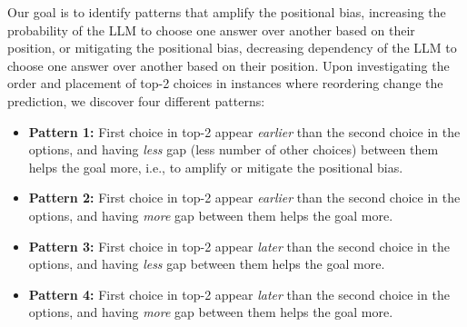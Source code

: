 \documentclass[11pt]{article}
\newcommand{\estevamc}[1]{\textcolor{purple}{Estevam: #1}}
\begin{document}
Our goal is to identify patterns that amplify the positional bias, increasing the probability of the LLM to choose one answer over another based on their position, or mitigating the positional bias, decreasing dependency of the LLM to choose one answer over another based on their position.  
Upon investigating the order and placement of top-2 choices in instances where reordering change the prediction, we discover four different patterns: %


\begin{itemize}
    \item \textbf{Pattern 1:} First choice in top-2 appear \textit{earlier} than the second choice in the options, and having \textit{less} gap (less number of other choices) between them helps the goal more, i.e., to amplify or mitigate the positional bias. 
    \item \textbf{Pattern 2:} First choice in top-2 appear \textit{earlier} than the second choice in the options, and having \textit{more} gap between them helps the goal more.
    \item \textbf{Pattern 3:} First choice in top-2 appear \textit{later} than the second choice in the options, and having \textit{less} gap between them helps the goal more.
    \item \textbf{Pattern 4:} First choice in top-2 appear \textit{later} than the second choice in the options, and having \textit{more} gap between them helps the goal more.
\end{itemize}
\end{document}
